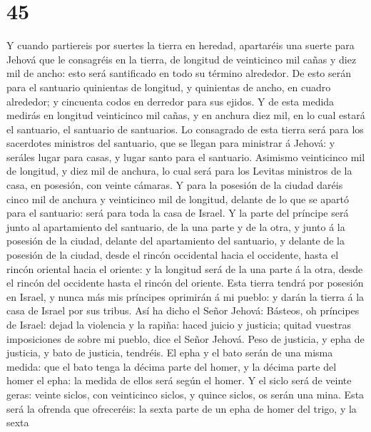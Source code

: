 \hypertarget{section-44}{%
\section{45}\label{section-44}}

 Y cuando partiereis por suertes la tierra en heredad,
apartaréis una suerte para Jehová que le consagréis en la tierra, de
longitud de veinticinco mil cañas y diez mil de ancho: esto será
santificado en todo su término alrededor.  De esto serán
para el santuario quinientas de longitud, y quinientas de ancho, en
cuadro alrededor; y cincuenta codos en derredor para sus ejidos.
 Y de esta medida medirás en longitud veinticinco mil cañas,
y en anchura diez mil, en lo cual estará el santuario, el santuario de
santuarios.  Lo consagrado de esta tierra será para los
sacerdotes ministros del santuario, que se llegan para ministrar á
Jehová: y seráles lugar para casas, y lugar santo para el santuario.
 Asimismo veinticinco mil de longitud, y diez mil de
anchura, lo cual será para los Levitas ministros de la casa, en
posesión, con veinte cámaras.  Y para la posesión de la
ciudad daréis cinco mil de anchura y veinticinco mil de longitud,
delante de lo que se apartó para el santuario: será para toda la casa de
Israel.  Y la parte del príncipe será junto al apartamiento
del santuario, de la una parte y de la otra, y junto á la posesión de la
ciudad, delante del apartamiento del santuario, y delante de la posesión
de la ciudad, desde el rincón occidental hacia el occidente, hasta el
rincón oriental hacia el oriente: y la longitud será de la una parte á
la otra, desde el rincón del occidente hasta el rincón del oriente.
 Esta tierra tendrá por posesión en Israel, y nunca más mis
príncipes oprimirán á mi pueblo: y darán la tierra á la casa de Israel
por sus tribus.  Así ha dicho el Señor Jehová: Básteos, oh
príncipes de Israel: dejad la violencia y la rapiña: haced juicio y
justicia; quitad vuestras imposiciones de sobre mi pueblo, dice el Señor
Jehová.  Peso de justicia, y epha de justicia, y bato de
justicia, tendréis.  El epha y el bato serán de una misma
medida: que el bato tenga la décima parte del homer, y la décima parte
del homer el epha: la medida de ellos será según el homer. 
Y el siclo será de veinte geras: veinte siclos, con veinticinco siclos,
y quince siclos, os serán una mina.  Esta será la ofrenda
que ofreceréis: la sexta parte de un epha de homer del trigo, y la sexta
